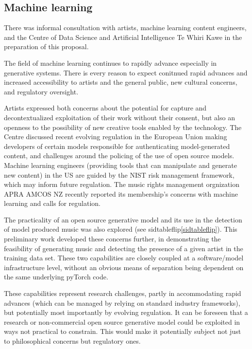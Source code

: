 \documentclass[10pt]{article}
\begin{document}
\begin{multicols*}{2}
\subsection{Machine learning}

There was informal consultation with artists, machine learning content engineers, and the Centre of Data Science and Artificial Intelligence Te Whiri Kawe in the preparation of this proposal.

The field of machine learning continues to rapidly advance especially in generative systems. There is every reason to expect conitnued rapid advances and increased accessibility to artists and the general public, new cultural concerns, and regulatory oversight.

Artists expressed both concerns about the potential for capture and decontextualized exploitation of their work without their consent\cite{datacollect}, but also an openness to the possibility of new creative tools enabled by the technology\cite{creativityai}. The Centre discussed recent evolving regulation in the European Union making developers of certain models responsible for authenticating model-generated content\cite{euairegs}, and challenges around the policing of the use of open source models. Machine learning engineers (providing tools that can manipulate and generate new content) in the US are guided by the NIST risk management framework\cite{nistai}, which may inform future regulation. The music rights management orgnization APRA AMCOS NZ recently reported its membership's concerns with machine learning and calls for regulation\cite{aprastory}.

The practicality of an open source generative model and its use in the detection of model produced music was also explored (see sidtableflip\ref{sidtableflip}). This preliminary work developed these concerns further, in demonstrating the feasibility of generating music and detecting the presence of a given artist in the training data set. These two capabilities are closely coupled at a software/model infrastructure level, without an obvious means of separation being dependent on the same underlying pyTorch code.

These capabilities represent research challenges, partly in accommodating rapid advances (which can be managed by relying on standard industry frameworks), but potentially most importantly by evolving regulation. It can be foreseen that a research or non-commercial open source generative model could be exploited in ways not practical to constrain. This would make it potentially subject not just to philosophical concerns but regulatory ones.


\end{multicols*}
\end{document}
